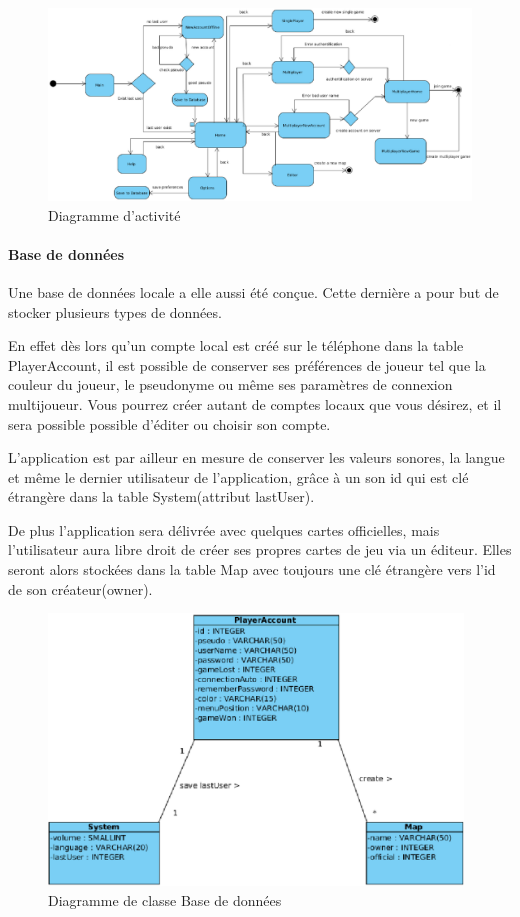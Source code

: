 	\begin{figure}
		\label{activité}
		\includegraphics[width=23cm, angle=90]{Analyse/Img/diag_activity.eps}
		\caption{Diagramme d'activité}
	\end{figure}

	\paragraph{Base de données\\}
			
		Une base de données locale a elle aussi été conçue. Cette dernière a pour
		but de stocker plusieurs types de données.
				
		En effet dès lors qu'un compte local est créé sur le téléphone dans la
		table PlayerAccount, il est possible de conserver ses préférences de joueur
		tel que la couleur du joueur, le pseudonyme ou même ses paramètres de connexion multijoueur. 
		Vous pourrez créer autant de comptes locaux que vous désirez, et il
		sera possible possible d'éditer ou choisir son compte.
				
		L'application est par ailleur en mesure de conserver
		les valeurs sonores, la langue et même le dernier utilisateur de
		l'application, grâce à un son id qui est clé étrangère dans la table System(attribut lastUser).
				
		De plus l'application sera délivrée avec quelques cartes officielles, mais
		l'utilisateur aura libre droit de créer ses propres cartes de jeu via un
		éditeur. Elles seront alors stockées dans la table Map avec toujours une
		clé étrangère vers l'id de son créateur(owner). \\
		
		\newpage
				
		\begin{figure}
			\includegraphics[width=11cm]{./Analyse/Img/menu_bdd.eps}
			\caption{Diagramme de classe Base de données}
		\end{figure}
		
